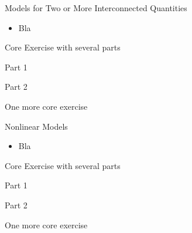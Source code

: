 %
%



\begin{module}{Models for Two or More Interconnected Quantities}
	\label{diff:sys}

	
	
\end{module}



\begin{lesson}

	\begin{itemize}
		\item Bla
	\end{itemize}
	

\end{lesson}


\newpage

\question
	Core Exercise with several parts
\begin{parts}
	\item Part 1
	\item Part 2
\end{parts}

\bookonlynewpage


\question
	One more core exercise





%
%



\begin{module}{Nonlinear Models}
	\label{diff:nonlinear}

	
	
\end{module}



\begin{lesson}

	\begin{itemize}
		\item Bla
	\end{itemize}
	

\end{lesson}


\newpage

\question
	Core Exercise with several parts
\begin{parts}
	\item Part 1
	\item Part 2
\end{parts}

\bookonlynewpage


\question
	One more core exercise



